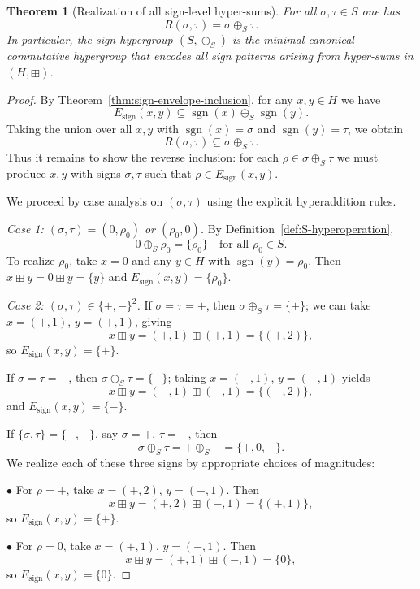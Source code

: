 \documentclass[11pt]{amsart}
\numberwithin{equation}{section}
\newtheorem{theorem}{Theorem}[section]
\theoremstyle{definition}
\theoremstyle{remark}
\newcommand{\Hnum}{H}                      %
\newcommand{\Sset}{S}                      %
\newcommand{\sgn}{\operatorname{sgn}}
\newcommand{\op}{\boxplus}                 %
\newcommand{\sop}{\oplus_S}                %
\begin{document}
\begin{theorem}[Realization of all sign-level hyper-sums]
\label{thm:sign-realization}
For all $\sigma,\tau\in\Sset$ one has
\[
  R(\sigma,\tau)
  = \sigma\sop\tau.
\]
In particular, the sign hypergroup $(\Sset,\sop)$ is the minimal
canonical commutative hypergroup that encodes all sign patterns arising
from hyper-sums in $(\Hnum,\op)$.
\end{theorem}

\begin{proof}
By Theorem~\ref{thm:sign-envelope-inclusion}, for any $x,y\in\Hnum$
we have
\[
  E_{\mathrm{sign}}(x,y)
  \subseteq \sgn(x)\sop\sgn(y).
\]
Taking the union over all $x,y$ with $\sgn(x)=\sigma$ and
$\sgn(y)=\tau$, we obtain
\[
  R(\sigma,\tau)
  \subseteq \sigma\sop\tau.
\]
Thus it remains to show the reverse inclusion:
for each $\rho\in\sigma\sop\tau$ we must produce $x,y$ with signs
$\sigma,\tau$ such that $\rho\in E_{\mathrm{sign}}(x,y)$.

We proceed by case analysis on $(\sigma,\tau)$ using the explicit
hyperaddition rules.

\smallskip\noindent
\emph{Case 1: $(\sigma,\tau)=(0,\rho_0)$ or $(\rho_0,0)$.}  By
Definition~\ref{def:S-hyperoperation},
\[
  0\sop\rho_0 = \{\rho_0\}
  \quad\text{for all }\rho_0\in\Sset.
\]
To realize $\rho_0$, take $x=0$ and any $y\in\Hnum$ with
$\sgn(y)=\rho_0$.  Then $x\op y = 0\op y = \{y\}$ and
$E_{\mathrm{sign}}(x,y)=\{\rho_0\}$.

\smallskip\noindent
\emph{Case 2: $(\sigma,\tau)\in\{+,-\}^2$.}  If
$\sigma=\tau=+$, then $\sigma\sop\tau=\{+\}$; we can take
$x=(+,1)$, $y=(+,1)$, giving
\[
  x\op y = (+,1)\op(+,1) = \{(+,2)\},
\]
so $E_{\mathrm{sign}}(x,y)=\{+\}$.

If $\sigma=\tau=-$, then $\sigma\sop\tau=\{-\}$; taking
$x=(-,1)$, $y=(-,1)$ yields
\[
  x\op y = (-,1)\op(-,1) = \{(-,2)\},
\]
and $E_{\mathrm{sign}}(x,y)=\{-\}$.

If $\{\sigma,\tau\}=\{+,-\}$, say $\sigma=+$, $\tau=-$, then
\[
  \sigma\sop\tau
  = +\sop-
  = \{+,0,-\}.
\]
We realize each of these three signs by appropriate choices of
magnitudes:

\smallskip
\noindent
$\bullet$ For $\rho=+$, take $x=(+,2)$, $y=(-,1)$.  Then
\[
  x\op y = (+,2)\op(-,1) = \{(+,1)\},
\]
so $E_{\mathrm{sign}}(x,y)=\{+\}$.

\smallskip
\noindent
$\bullet$ For $\rho=0$, take $x=(+,1)$, $y=(-,1)$.  Then
\[
  x\op y = (+,1)\op(-,1) = \{0\},
\]
so $E_{\mathrm{sign}}(x,y)=\{0\}$.


\end{proof}
\end{document}
